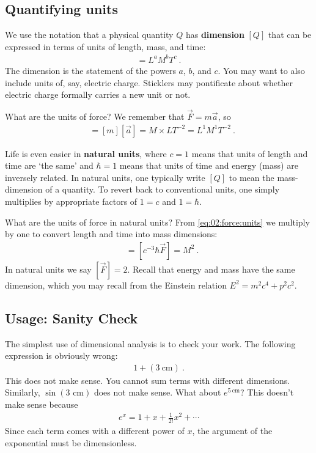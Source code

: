 \subsection{Quantifying units}

We use the notation that a physical quantity $Q$ has \textbf{dimension} $[Q]$ that can be expressed in terms of units of length, mass, and time:
\begin{align}
  [Q] = L^a M^b T^c \ .
\end{align}
The {dimension} is the statement of the powers $a$, $b$, and $c$. You may want to also include units of, say, electric charge. Sticklers may pontificate about whether electric charge formally carries a new unit or not. 

\begin{example}
What are the units of force? We remember that $\vec{F} = m\vec{a}$, so 
\begin{align}
  [\vec F] &= [m][\vec{a}] = M\times L T^{-2} = L^1 M^1 T^{-2} \ .
  \label{eq:02:force:units}
\end{align}
\end{example}

Life is even easier in \textbf{natural units}, where $c=1$ means that units of length and time are `the same’ and $\hbar = 1$ means that units of time and energy (mass) are inversely related. In natural units, one typically write $[Q]$ to mean the mass-dimension of a quantity. To revert back to conventional units, one simply multiplies by appropriate factors of $1=c$ and $1=\hbar$. 

\begin{example}
What are the units of force in natural units? From \eqref{eq:02:force:units} we multiply by one to convert length and time into mass dimensions:
\begin{align}
  [\vec F] &= [c^{-3} \hbar \vec{F}] = M^2 \ .
\end{align}
In natural units we say $[\vec F] = 2$. Recall that energy and mass have the same dimension, which you may recall from the Einstein relation $E^2 = m^2c^4 + p^2c^2$.
\end{example}


\subsection{Usage: Sanity Check}

The simplest use of dimensional analysis is to check your work. The following expression is obviously wrong:
\begin{align}
  1 + (3~\text{cm}) \ .
\end{align}
This does not make sense. You cannot sum terms with different dimensions. Similarly, $\sin(3\text{ cm})$ does not make sense. What about $e^{5~\text{cm}}$? This doesn't make sense because
\begin{align}
  e^x = 1 + x + \frac{1}{2!} x^2 +  \cdots
\end{align}
Since each term comes with a different power of $x$, the argument of the exponential must be dimensionless. 

